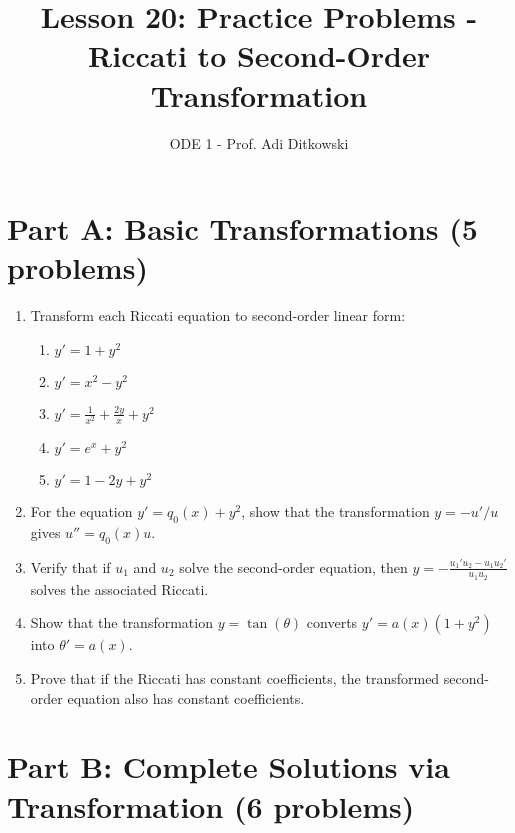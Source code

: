 \documentclass[12pt]{article}
\title{Lesson 20: Practice Problems - Riccati to Second-Order Transformation}
\author{ODE 1 - Prof. Adi Ditkowski}
\date{}
\begin{document}
\maketitle

\section*{Part A: Basic Transformations (5 problems)}

\begin{enumerate}
    \item Transform each Riccati equation to second-order linear form:
    \begin{enumerate}[label=(\alph*)]
        \item $y' = 1 + y^2$
        \item $y' = x^2 - y^2$
        \item $y' = \frac{1}{x^2} + \frac{2y}{x} + y^2$
        \item $y' = e^x + y^2$
        \item $y' = 1 - 2y + y^2$
    \end{enumerate}

    \item For the equation $y' = q_0(x) + y^2$, show that the transformation $y = -u'/u$ gives $u'' = q_0(x)u$.

    \item Verify that if $u_1$ and $u_2$ solve the second-order equation, then $y = -\frac{u_1' u_2 - u_1 u_2'}{u_1 u_2}$ solves the associated Riccati.

    \item Show that the transformation $y = \tan(\theta)$ converts $y' = a(x)(1 + y^2)$ into $\theta' = a(x)$.

    \item Prove that if the Riccati has constant coefficients, the transformed second-order equation also has constant coefficients.
\end{enumerate}

\section*{Part B: Complete Solutions via Transformation (6 problems)}
\end{document}
